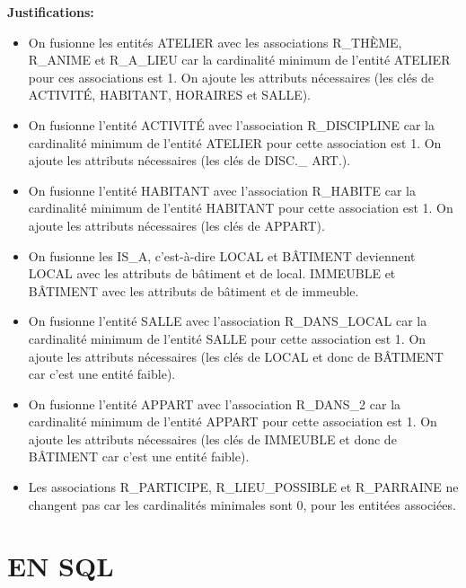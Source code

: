 \documentclass[a4paper,10.5pt]{report}
\begin{document}
	\textbf{Justifications: }
	\begin{itemize}
		\item	On fusionne les entités ATELIER avec les associations R\_THÈME, R\_ANIME et R\_A\_LIEU car la cardinalité minimum de l'entité ATELIER pour ces associations est 1. On ajoute les attributs nécessaires (les clés de ACTIVITÉ, HABITANT, HORAIRES et SALLE).
		\item	On fusionne l'entité ACTIVITÉ avec l'association R\_DISCIPLINE car la cardinalité minimum de l'entité ATELIER pour cette association est 1. On ajoute les attributs nécessaires (les clés de DISC.\_ ART.).
		\item	On fusionne l'entité HABITANT avec l'association R\_HABITE car la cardinalité minimum de l'entité HABITANT pour cette association est 1. On ajoute les attributs nécessaires (les clés de APPART).
		\item On fusionne les IS\_A, c'est-à-dire LOCAL et BÂTIMENT deviennent LOCAL avec les attributs de bâtiment et de local. IMMEUBLE et BÂTIMENT avec les attributs de bâtiment et de immeuble.
		\item	On fusionne l'entité SALLE avec l'association R\_DANS\_LOCAL car la cardinalité minimum de l'entité SALLE pour cette association est 1. On ajoute les attributs nécessaires (les clés de LOCAL et donc de BÂTIMENT car c'est une entité faible). 
		\item	On fusionne l'entité APPART avec l'association R\_DANS\_2 car la cardinalité minimum de l'entité APPART pour cette association est 1. On ajoute les attributs nécessaires (les clés de IMMEUBLE et donc de BÂTIMENT car c'est une entité faible).
		\item Les associations R\_PARTICIPE, R\_LIEU\_POSSIBLE et R\_PARRAINE ne changent pas car les cardinalités minimales sont 0, pour les entitées associées.

	\end{itemize}
	\newpage
    \section{EN SQL}
\end{document}
